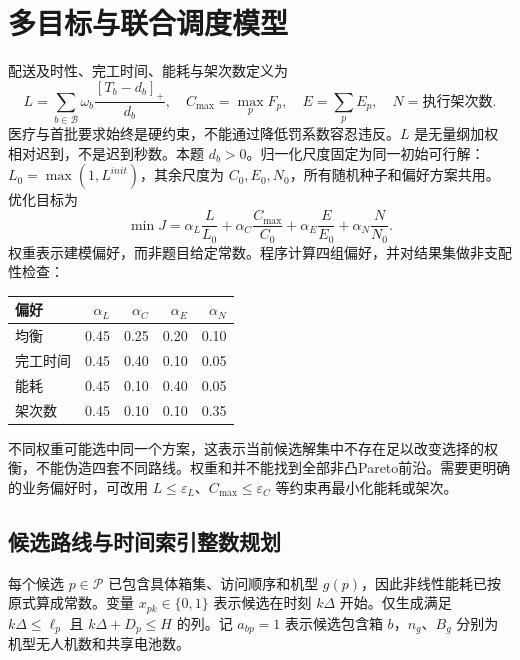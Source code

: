 \documentclass[a4paper,11pt]{article}
\newcommand{\pos}[1]{\left[#1\right]_+}
\begin{document}
\section{多目标与联合调度模型}
配送及时性、完工时间、能耗与架次数定义为
\begin{equation}
 L=\sum_{b\in\mathcal B}\omega_b\frac{\pos{T_b-d_b}}{d_b},\quad
 C_{\max}=\max_p F_p,\quad E=\sum_p E_p,\quad N=\text{执行架次数}.
\end{equation}
医疗与首批要求始终是硬约束，不能通过降低罚系数容忍违反。$L$ 是无量纲加权相对迟到，不是迟到秒数。本题 $d_b>0$。归一化尺度固定为同一初始可行解：$L_0=\max(1,L^{init})$，其余尺度为 $C_0,E_0,N_0$，所有随机种子和偏好方案共用。优化目标为
\begin{equation}\label{eq:objective}
 \min J=\alpha_L\frac L{L_0}+\alpha_C\frac{C_{\max}}{C_0}
          +\alpha_E\frac E{E_0}+\alpha_N\frac N{N_0}.
\end{equation}
权重表示建模偏好，而非题目给定常数。程序计算四组偏好，并对结果集做非支配性检查：
\begin{center}\begin{tabular}{lrrrr}\toprule
偏好 &$\alpha_L$&$\alpha_C$&$\alpha_E$&$\alpha_N$\\\midrule
均衡 &0.45&0.25&0.20&0.10\\
完工时间 &0.45&0.40&0.10&0.05\\
能耗 &0.45&0.10&0.40&0.05\\
架次数 &0.45&0.10&0.10&0.35\\\bottomrule
\end{tabular}\end{center}
不同权重可能选中同一个方案，这表示当前候选解集中不存在足以改变选择的权衡，不能伪造四套不同路线。权重和并不能找到全部非凸Pareto前沿。需要更明确的业务偏好时，可改用 $L\le\varepsilon_L$、$C_{\max}\le\varepsilon_C$ 等约束再最小化能耗或架次。

\subsection{候选路线与时间索引整数规划}
每个候选 $p\in\mathcal P$ 已包含具体箱集、访问顺序和机型 $g(p)$，因此非线性能耗已按原式算成常数。变量 $x_{pk}\in\{0,1\}$ 表示候选在时刻 $k\Delta$ 开始。仅生成满足 $k\Delta\le\ell_p$ 且 $k\Delta+D_p\le H$ 的列。记 $a_{bp}=1$ 表示候选包含箱 $b$，$n_g$、$B_g$ 分别为机型无人机数和共享电池数。
\end{document}
